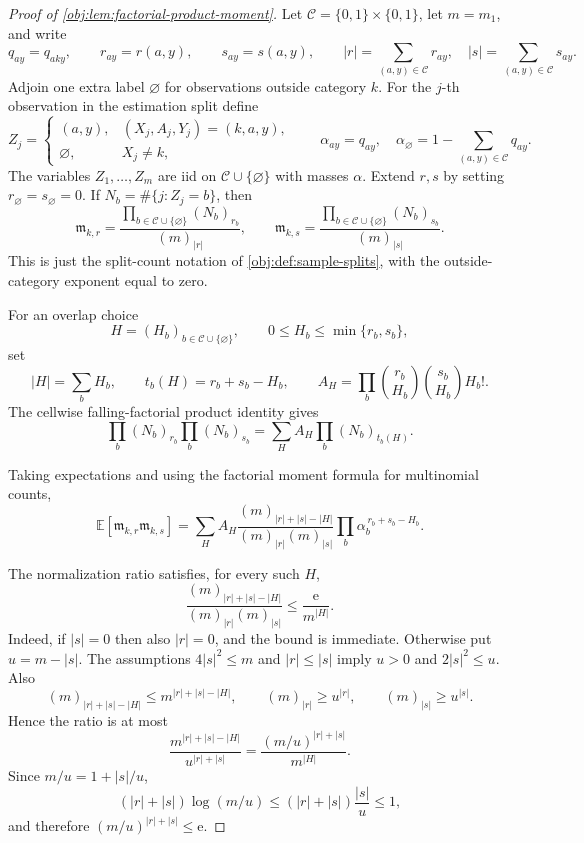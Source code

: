 \documentclass[11pt]{article}
\begin{document}
\begin{proof}[Proof of \cref{obj:lem:factorial-product-moment}]
Let \(\mathcal C=\{0,1\}\times\{0,1\}\), let \(m=m_1\), and write
\[
q_{ay}=q_{aky},\qquad r_{ay}=r(a,y),\qquad s_{ay}=s(a,y),
\qquad |r|=\sum_{(a,y)\in\mathcal C}r_{ay},\quad |s|=\sum_{(a,y)\in\mathcal C}s_{ay}.
\]
Adjoin one extra label \(\varnothing\) for observations outside category \(k\).  For the \(j\)-th observation in the estimation split define
\[
Z_j=
\begin{cases}
(a,y),& (X_j,A_j,Y_j)=(k,a,y),\\
\varnothing,& X_j\ne k,
\end{cases}
\qquad
\alpha_{ay}=q_{ay},\quad
\alpha_{\varnothing}=1-\sum_{(a,y)\in\mathcal C}q_{ay}.
\]
The variables \(Z_1,\ldots,Z_m\) are iid on \(\mathcal C\cup\{\varnothing\}\) with masses \(\alpha\).  Extend \(r,s\) by setting \(r_{\varnothing}=s_{\varnothing}=0\).  If \(N_b=\#\{j:Z_j=b\}\), then
\[
\mathfrak m_{k,r}
=
\frac{\prod_{b\in\mathcal C\cup\{\varnothing\}}(N_b)_{r_b}}{(m)_{|r|}},
\qquad
\mathfrak m_{k,s}
=
\frac{\prod_{b\in\mathcal C\cup\{\varnothing\}}(N_b)_{s_b}}{(m)_{|s|}} .
\]
This is just the split-count notation of \cref{obj:def:sample-splits}, with the outside-category exponent equal to zero. %

For an overlap choice
\[
H=(H_b)_{b\in\mathcal C\cup\{\varnothing\}},
\qquad
0\le H_b\le \min\{r_b,s_b\},
\]
set
\[
|H|=\sum_b H_b,\qquad
t_b(H)=r_b+s_b-H_b,\qquad
A_H=\prod_b {r_b\choose H_b}{s_b\choose H_b}H_b! .
\]
The cellwise falling-factorial product identity gives
\[
\prod_b (N_b)_{r_b}\prod_b (N_b)_{s_b}
=
\sum_H
A_H\prod_b (N_b)_{t_b(H)} .
\]

Taking expectations and using the factorial moment formula for multinomial counts,
\[
\mathbb E\!\left[
\mathfrak m_{k,r}\mathfrak m_{k,s}
\right]
=
\sum_H
A_H
\frac{(m)_{|r|+|s|-|H|}}{(m)_{|r|}(m)_{|s|}}
\prod_b \alpha_b^{\,r_b+s_b-H_b}.
\]

The normalization ratio satisfies, for every such \(H\),
\[
\frac{(m)_{|r|+|s|-|H|}}{(m)_{|r|}(m)_{|s|}}
\le
\frac{\mathrm e}{m^{|H|}} .
\]
Indeed, if \(|s|=0\) then also \(|r|=0\), and the bound is immediate.  Otherwise put \(u=m-|s|\).  The assumptions \(4|s|^2\le m\) and \(|r|\le |s|\) imply \(u>0\) and \(2|s|^2\le u\).  Also
\[
(m)_{|r|+|s|-|H|}\le m^{|r|+|s|-|H|},\qquad
(m)_{|r|}\ge u^{|r|},\qquad
(m)_{|s|}\ge u^{|s|}.
\]
Hence the ratio is at most
\[
\frac{m^{|r|+|s|-|H|}}{u^{|r|+|s|}}
=
\frac{(m/u)^{|r|+|s|}}{m^{|H|}} .
\]
Since \(m/u=1+|s|/u\),
\[
(|r|+|s|)\log(m/u)
\le
(|r|+|s|)\frac{|s|}{u}
\le 1,
\]
and therefore \((m/u)^{|r|+|s|}\le \mathrm e\). %


\end{proof}
\end{document}

